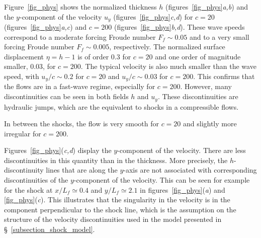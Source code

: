 Figure~\ref{fig_phys} shows %
the normalized thickness $h$ %
(figures~\ref{fig_phys}\textit{a,b}) %
and the $y$-component of the velocity $u_y$ %
(figures~\ref{fig_phys}\textit{c,d}) %
for $c = 20$ (figures~\ref{fig_phys}\textit{a,c}) and %
$c = 200$ (figures~\ref{fig_phys}\textit{b,d}).
%
These wave speeds correspond %
to a moderate forcing Froude number $F_f \sim 0.05$ and %
to a very small forcing Froude number $F_f \sim 0.005$, respectively.
The normalized surface displacement $\eta = h - 1$ is of order 0.3 for
$c = 20$ and one order of magnitude smaller, 0.03, for $c = 200$.
%
The typical velocity is also much smaller than the wave speed, %
with $u_y/c \sim 0.2$ for $c = 20$ %
and $u_y/c \sim 0.03$ for $c = 200$. %
This confirms that the flows are in a fast-wave regime, especially for
$c = 200$.
%
However, many discontinuities can be seen in both fields $h$ and
$u_y$.  These discontinuities are hydraulic jumps, which are the
equivalent to shocks in a compressible flows.
%

\nocite{Baines1998}

%
In between the shocks, the flow is very smooth for $c=20$ and slightly
more irregular for $c = 200$.

Figures~\ref{fig_phys}(\textit{c,d}) display the $y$-component of the
velocity.  There are less discontinuities in this quantity than in the
thickness. More precisely, the $h$-discontinuity lines that are along
the $y$-axis are not associated with corresponding discontinuities of
the $y$-component of the velocity. This can be seen for example for
the shock at $x/L_f\simeq 0.4$ and $y/L_f\simeq 2.1$ in
figures~\ref{fig_phys}(\textit{a}) and \ref{fig_phys}(\textit{c}).
%
This illustrates that the singularity in the velocity is in the
component perpendicular to the shock line, which is the assumption on
the structure of the velocity discontinuities used in the model
presented in \S~\ref{subsection_shock_model}.







